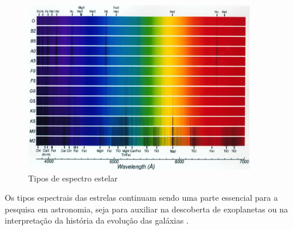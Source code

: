 \begin{figure}[htb]
\centering
\includegraphics[width=10cm]{figuras/Spectra_Briley.jpg}
\caption{Tipos de espectro estelar \citep{astroprinceton}}
\label{fig:stellar-spectrum-types}
\end{figure}

Os tipos espectrais das estrelas continuam sendo uma parte essencial para a pesquisa em astronomia, seja para auxiliar na descoberta de exoplanetas ou na interpretação da história da evolução das galáxias \citep{Charbonneau_2002}. 



